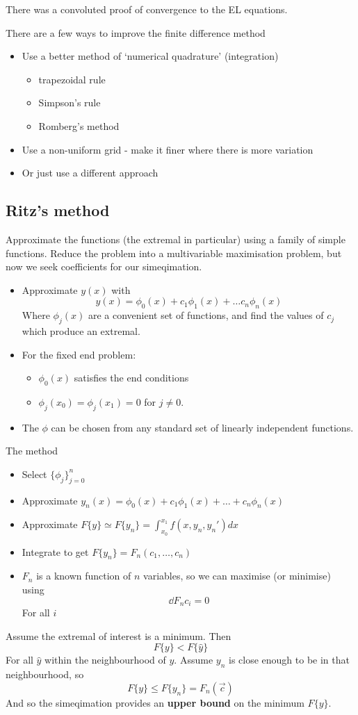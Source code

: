 \documentclass{E:/Documents/Latex/myassignment}
\begin{document}
There was a convoluted proof of convergence to the EL equations.

There are a few ways to improve the finite difference method
\begin{itemize}
 	\item Use a better method of `numerical quadrature' (integration)
 	\begin{itemize}
 		\item trapezoidal rule
 		\item Simpson's rule
 		\item Romberg's method
 	\end{itemize}
 	\item Use a non-uniform grid - make it finer where there is more variation
 	\item Or just use a different approach
 \end{itemize} 

\subsection{Ritz's method}
Approximate the functions (the extremal in particular) using a family of simple functions. Reduce the problem into a multivariable maximisation problem, but now we seek coefficients for our simeqimation.

\begin{itemize}
	\item Approximate $y(x)$ with
	\[y(x) = \phi_0(x) + c_1 \phi_1(x) + \ldots c_n \phi_n(x)\]
	Where $\phi_j(x)$ are a convenient set of functions, and find the values of $c_j$ which produce an extremal.
	\item For the fixed end problem:
	\begin{itemize}
		\item $\phi_0(x)$ satisfies the end conditions
		\item $\phi_j(x_0) = \phi_j(x_1) = 0$ for $j\neq 0$.
	\end{itemize}
	\item The $\phi$ can be chosen from any standard set of linearly independent functions.
\end{itemize}

The method 
\begin{itemize}
	\item Select $\{\phi_j\}_{j=0}^n$
	\item Approximate $y_n(x) = \phi_0(x) + c_1 \phi_1(x) + \ldots + c_n\phi_n(x)$
	\item Approximate $F\{y\} \simeq F\{y_n\} = \int_{x_0}^{x_1} f(x,y_n,y_n') dx$
	\item Integrate to get $F\{y_n\} = F_n(c_1,\ldots,c_n)$
	\item $F_n$ is a known function of $n$ variables, so we can maximise (or minimise) using 
	\[\dd{F_n}{c_i} = 0\]
	For all $i$
\end{itemize}
Assume the extremal of interest is a minimum. Then 
\[F\{y\} < F\{\hat{y}\}\]
For all $\hat{y}$ within the neighbourhood of $y$. Assume $y_n$ is close enough to be in that neighbourhood, so
\[F\{y\} \leq F\{y_n\} = F_n(\vec c)\]
And so the simeqimation provides an \textbf{upper bound} on the minimum $F\{y\}$.
\end{document}
